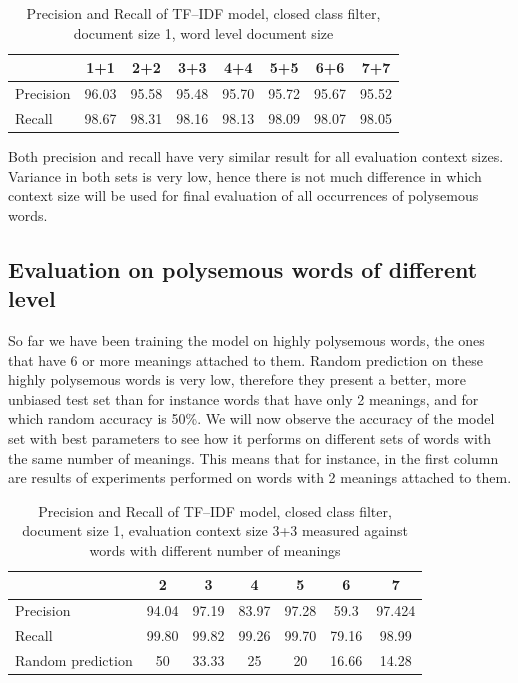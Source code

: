 \begin{table}[h!]
\begin{tabular}{ l | c c c c c c c}
    &  1+1 & 2+2 & 3+3 & 4+4 & 5+5 & 6+6 & 7+7 \\
\hline
Precision &96.03 &95.58   & 95.48  &  95.70 & 95.72  & 95.67  & 95.52  \\
\hline
Recall  & 98.67 & 98.31  & 98.16  & 98.13  & 98.09  & 98.07  &  98.05 \\
\end{tabular}
\caption{Precision and Recall of TF--IDF model, closed class filter, document size 1, word level document size}
\end{table} 

Both precision and recall have very similar result for all evaluation context sizes. Variance in both sets 
is very low, hence there is not much difference in which context size will be used for final evaluation
of all occurrences of polysemous words.


\subsection{ Evaluation on polysemous words of different level}
So far we have been training the model on highly polysemous words, the ones that have 6 or more 
meanings attached to them. Random prediction on these highly polysemous words is very low, therefore
they present a better, more unbiased test set than for instance words that have only 2 meanings, and 
for which random accuracy is 50\%. We will now observe the accuracy of the model set with best
parameters to see how it performs on different sets of words with the same number of meanings. This means
that for instance, in the first column are results of experiments performed on words with 2 meanings attached to them.

\begin{table}[h!]
\begin{tabular}{ l | c c c c c c   }
     & 2 & 3 & 4 & 5 & 6& 7   \\
 \hline
Precision & 94.04 &97.19 &83.97 &97.28 &59.3 &97.424 \\
Recall   &  99.80 &99.82 &99.26 &99.70 &79.16 &98.99   \\
Random prediction    & 50 & 33.33 & 25 & 20 & 16.66 & 14.28      \\
\end{tabular}
\caption{Precision and Recall of TF--IDF model, closed class filter, document size 1, evaluation context size 3+3 measured against words with different number of meanings}
\end{table} 

